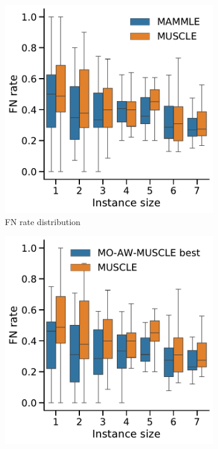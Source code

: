 \begin{figure}[!htbp]%
	\begin{adjustwidth}{-1.2cm}{}
		\centering
		\begin{subfigure}{0.40\textwidth} \includegraphics[width=\textwidth]{Figure/comparison} \caption{FN rate distribution} \label{fig:boxplot} \end{subfigure}
		\begin{subfigure}{0.40\textwidth} \includegraphics[width=\textwidth]{Figure/comparison-momuscle} 

\end{subfigure}
\end{adjustwidth}
\end{figure}
